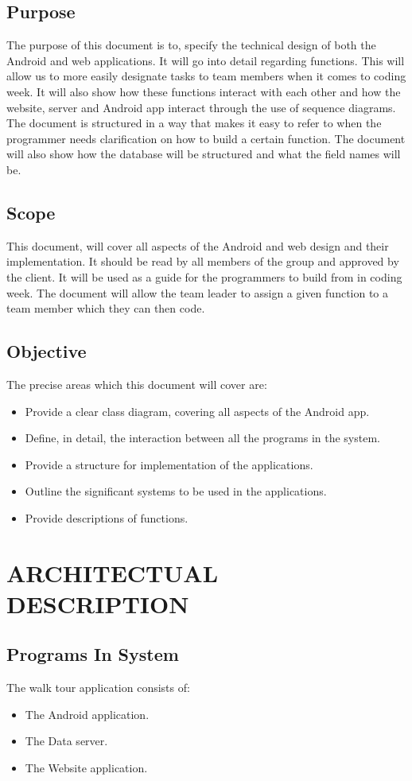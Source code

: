 \documentclass[12pt]{article}
\begin{document}
\subsection{Purpose}
The purpose of this document is to, specify the technical design of both the Android and web applications. It will go into detail regarding functions. This will allow us to more easily designate tasks to team members when it comes to coding week. It will also show how these functions interact with each other and how the website, server and Android app interact through the use of sequence diagrams. The document is structured in a way that makes it easy to refer to when the programmer needs clarification on how to build a certain function. The document will also show how the database will be structured and what the field names will be.
\subsection{Scope}
This document, will cover all aspects of the Android and web design and their implementation. It should be read by all members of the group and approved by the client. It will be used as a guide for the programmers to build from in coding week. The document will allow the team leader to assign a given function to a team member which they can then code.
\subsection{Objective}
The precise areas which this document will cover are:
\begin{itemize}
\item Provide a clear class diagram, covering all aspects of the Android app.
\item Define, in detail, the interaction between all the programs in the system.
\item Provide a structure for implementation of the applications.
\item Outline the significant systems to be used in the applications.
\item Provide descriptions of functions.
\end{itemize}
\newpage
\section{ARCHITECTUAL DESCRIPTION}
\subsection{Programs In System}
The walk tour application consists of:
\begin{itemize}
\item The Android application. 
\item The Data server. 
\item The Website application.
\end{itemize}
\end{document}
